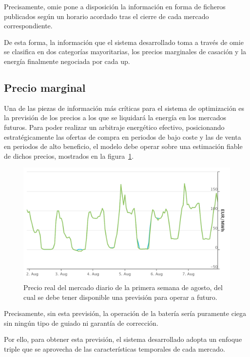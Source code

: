 Precisamente, \gls{omie} pone a disposición la información en forma de ficheros publicados según un horario acordado tras el cierre de cada mercado correspondiente.

De esta forma, la información que el sistema desarrollado toma a través de \gls{omie} se clasifica en dos categorías mayoritarias, los precios marginales de casación y la energía finalmente negociada por cada \gls{up}.

\subsection{Precio marginal}%
\label{makereference4.1.1}

Una de las piezas de información más críticas para el sistema de optimización es la previsión de los precios a los que se liquidará la energía en los mercados futuros. Para poder realizar un arbitraje energético efectivo, posicionando estratégicamente las ofertas de compra en periodos de bajo coste y las de venta en periodos de alto beneficio, el modelo debe operar sobre una estimación fiable de dichos precios, mostrados en la figura~\ref{fig:mercado-diario}.

\begin{figure}
  \centering
  \includegraphics[width=0.75\linewidth]{figures/mercado-diario.png}
  \caption[Precio del mercado diario de la primera semana de agosto.]{Precio real del mercado diario de la primera semana de agosto, del cual se debe tener disponible una previsión para operar a futuro.}%
  \label{fig:mercado-diario}
\end{figure}

Precisamente, sin esta previsión, la operación de la batería sería puramente ciega sin ningún tipo de guiado ni garantía de corrección.

Por ello, para obtener esta previsión, el sistema desarrollado adopta un enfoque triple que se aprovecha de las características temporales de cada mercado.

